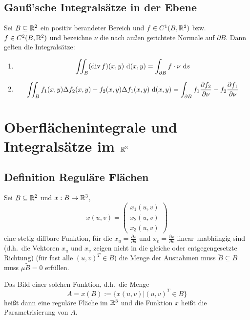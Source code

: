 \subsection{Gauß'sche Integralsätze in der Ebene}
Sei $B \subseteq \mathbb{R}^2$ ein positiv berandeter Bereich und $f \in C^1(B, \mathbb{R}^2)$
bzw. $f \in C^2(B, \mathbb{R}^2)$ und bezeichne $\nu$ die nach außen gerichtete Normale
auf $\partial B$. Dann gelten die Integralsätze:
\begin{enumerate}[label = (\roman*)]
    \item
        \begin{equation*}
            \iint_B (\operatorname{div} f)(x,y) \text{ d}(x,y) = \int_{\partial B} f \cdot \nu \text{ d}s
        \end{equation*}
    \item
        \begin{equation*}
            \iint_B f_1(x,y) \Delta f_2(x,y) - f_2(x,y) \Delta f_1(x,y) \text{ d}(x,y)
            = \int_{\partial B} f_1 \frac{\partial f_2}{\partial \nu} - f_2
            \frac{\partial f_1}{\partial \nu}
        \end{equation*}
\end{enumerate}

\section{Oberflächenintegrale und Integralsätze im $\mathbb{R}^3$}
\subsection{Definition Reguläre Flächen}
Sei $B \subseteq \mathbb{R}^2$ und $x: B \to \mathbb{R}^3$,
\begin{equation*}
    x(u,v) =
    \begin{pmatrix}
        x_1(u,v)\\
        x_2(u,v)\\
        x_3(u,v)
    \end{pmatrix}
\end{equation*}
eine stetig diffbare Funktion, für die $x_u = \frac{\partial x}{\partial u}$ und
$x_v = \frac{\partial x}{\partial v}$ linear unabhängig sind (d.h.\ die Vektoren
$x_u$ und $x_v$ zeigen nicht in die gleiche oder entgegengesetzte Richtung) (für
fast alle ${(u,v)}^T \in B$) die Menge der Ausnahmen muss $\tilde{B} \subseteq B$
muss $\mu{\tilde{B}} = 0$ erfüllen.

Das Bild einer solchen Funktion, d.h.\ die Menge
\begin{equation*}
    A = x(B) := \{ x(u,v) \vert {(u,v)}^T \in B \}
\end{equation*}
heißt dann eine reguläre Fläche im $\mathbb{R}^3$ und die Funktion $x$ heißt die
Parametrisierung von $A$.

